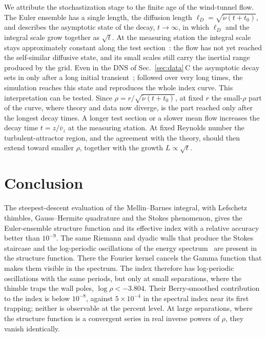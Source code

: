 \documentclass[floatfix,aps,pre,preprint,superscriptaddress,nofootinbib,amsmath,amssymb]{revtex4-2}
\begin{document}
We attribute the stochastization stage to the finite age of the wind-tunnel flow. The Euler ensemble has a single length,
the diffusion length $\ell_D=\sqrt{\tilde\nu(t+t_0)}$, and describes the asymptotic state of the decay, $t\to\infty$, in which
$\ell_D$ and the integral scale grow together as $\sqrt t$. At the measuring station the integral scale stays approximately
constant along the test section~\cite{GregXi2}: the flow has not yet reached the self-similar diffusive state, and its small
scales still carry the inertial range produced by the grid. Even in the DNS of Sec.~\ref{sec:data}\,C the asymptotic decay
sets in only after a long initial transient~\cite{SreeniAkash2025}; followed over very long times, the simulation reaches this
state and reproduces the whole index curve. This interpretation can be tested. Since $\rho=r/\sqrt{\tilde\nu(t+t_0)}$, at
fixed $r$ the small-$\rho$ part of the curve, where theory and data now diverge, is the part reached only after the longest
decay times. A longer test section or a slower mean flow increases the decay time $t=z/\bar v_z$ at the measuring station. At
fixed Reynolds number the turbulent-attractor region, and the agreement with the theory, should then extend toward smaller
$\rho$, together with the growth $L\propto\sqrt t$.

\section{Conclusion}

The steepest-descent evaluation of the Mellin--Barnes integral, with Lefschetz thimbles, Gauss--Hermite quadrature and the
Stokes phenomenon, gives the Euler-ensemble structure function and its effective index with a relative accuracy better than
$10^{-9}$. The same
Riemann and dyadic walls that produce the Stokes staircase and the log-periodic oscillations of the energy
spectrum~\cite{migdal2026Riemann} are present in the structure function. There the Fourier kernel cancels the Gamma function
that makes them visible in the spectrum. The index therefore has log-periodic oscillations with the same periods, but only at
small separations, where the thimble traps the wall poles, $\log\rho<-3.804$. Their Berry-smoothed contribution to the index
is below $10^{-8}$, against $5\times10^{-4}$ in the spectral index near its first trapping; neither is observable at the
percent level. At large separations, where the structure function is a convergent series in real inverse powers of $\rho$,
they vanish identically.
\end{document}
